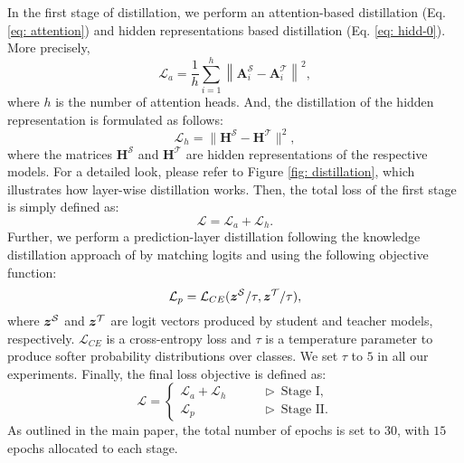 In the first stage of distillation, we perform an attention-based distillation (Eq. \ref{eq: attention}) and hidden representations based distillation (Eq. \ref{eq: hidd-0}). More precisely, 
\begin{equation}
    \mathcal{L}_{a} = \frac{1}{h} \sum_{i=1}^h \left\|\mathbf{A}_i^{\mathcal{S}} - \mathbf{A}_i^{\mathcal{T}}\right\|^2, 
    \label{eq: attn}
\end{equation}
where $h$ is the number of attention heads. And, the distillation of the hidden representation is formulated as follows: 
\begin{equation}
    \mathcal{L}_{h} = \|\mathbf{H}^{\mathcal{S}} - \mathbf{H}^{\mathcal{T}}\|^2, 
    \label{eq: hidd}
\end{equation}
where the matrices $\mathbf{H}^{\mathcal{S}}$ and $\mathbf{H}^{\mathcal{T}}$ are hidden representations of the respective models. For a detailed look, please refer to Figure \ref{fig: distillation}, which illustrates how layer-wise distillation works. Then, the total loss of the first stage is simply defined as: 
\begin{equation}
    \mathcal{L} = \mathcal{L}_{a} + \mathcal{L}_{h}. 
\end{equation}
Further, we perform a prediction-layer distillation following the knowledge distillation approach of \cite{hinton2015distilling} by matching logits and using the following objective function: 
\begin{equation}
    \mathcal{L}_{p} = \mathcal{L}_{CE} ({\bm{z}}^{\mathcal{S}} / \tau, {\bm{z}}^{\mathcal{T}} / \tau), 
\end{equation}
where ${\bm{z}}^{\mathcal{S}}$ and ${\bm{z}}^{\mathcal{T}}$ are logit vectors produced by student and teacher models, respectively. $\mathcal{L}_{CE}$ is a cross-entropy loss and $\tau$ is a temperature parameter to produce softer probability distributions over classes. We set $\tau$ to $5$ in all our experiments. 
Finally, the final loss objective is defined as: 
\begin{equation}
    \mathcal{L} = 
    \begin{cases}
        \mathcal{L}_a + \mathcal{L}_h & \qquad \triangleright\ \text{Stage I}, \\ 
        \mathcal{L}_p & \qquad \triangleright\ \text{Stage II}. 
    \end{cases}
    \label{eq: total-loss}
\end{equation}
As outlined in the main paper, the total number of epochs is set to $30$, with $15$ epochs allocated to each stage. 

